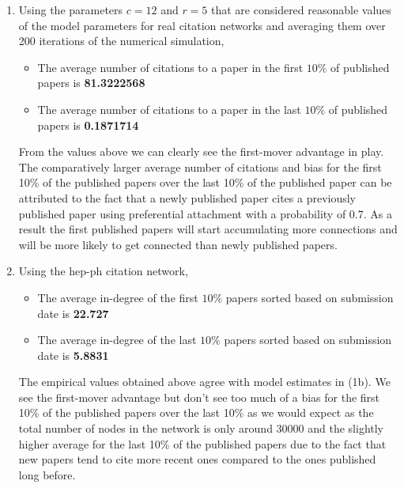 \documentclass{article}
\begin{document}
\begin{enumerate}[label=(\alph*)]
\item
Using the parameters $c=12$ and $r=5$ that are considered reasonable values of the model parameters for real citation networks and averaging them over 200 iterations of the numerical simulation,
\begin{itemize}
\item
The average number of citations to a paper in the first $10\%$ of published papers is \textbf{81.3222568}
\item
The average number of citations to a paper in the last $10\%$ of published papers is \textbf{0.1871714}
\end{itemize}

From the values above we can clearly see the first-mover advantage in play. The comparatively larger average number of citations and bias for the first 10\% of the published papers over the last 10\% of the published paper can be attributed to the fact that a newly published paper cites a previously published paper using preferential attachment with a probability of 0.7. As a result the first published papers will start accumulating more connections and will be more likely to get connected than newly published papers.
 
\item
Using the hep-ph citation network,
\begin{itemize}
\item
The average in-degree of the first $10\%$ papers sorted based on submission date is \textbf{22.727}
\item
The average in-degree of the last $10\%$ papers sorted based on submission date is \textbf{5.8831}
\end{itemize} 

The empirical values obtained above agree with model estimates in (1b). We see the first-mover advantage but don't see too much of a bias for the first 10\% of the published papers over the last 10\% as we would expect as the total number of nodes in the network is only around 30000 and the slightly higher average for the last 10\% of the published papers due to the fact that new papers tend to cite more recent ones compared to the ones published long before.


\end{enumerate}
\end{document}
